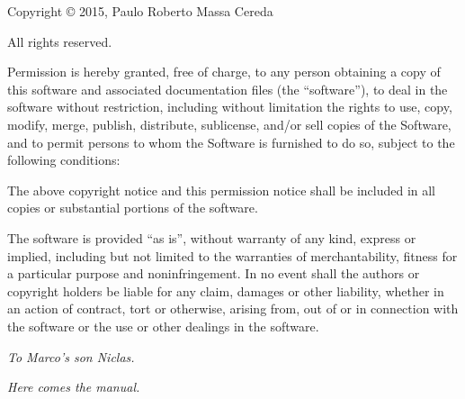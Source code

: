 \documentclass[a4paper,twoside,12pt]{memoir}
\begin{document}
\vspace{1.5em}


\noindent Copyright \copyright{} 2015, Paulo Roberto Massa Cereda

\noindent All rights reserved.

\vspace{1em}

\noindent Permission is hereby granted, free of charge, to any person obtaining a  copy  of this  software  and  associated documentation  files  (the ``software''), to  deal in the software without  restriction, including without limitation the rights to  use, copy, modify,  merge, publish, distribute, sublicense,  and/or sell  copies of  the Software,  and to permit persons to whom the Software  is furnished to do so, subject to the following conditions:

\vspace{1em}

\noindent The above copyright notice and this permission notice shall be included in all copies or substantial portions of the software.

\vspace{1em}

\noindent The software is provided ``as is'', without warranty of any kind, express or implied, including but not limited to the warranties of merchantability, fitness for a particular purpose and noninfringement. In no event shall the authors or copyright holders be liable for any claim, damages or other liability, whether in an action of contract, tort or otherwise, arising from, out of or in connection with the software or the use or other dealings in the software.

\ornamentline

\cleardoublepage

\vspace*{25em}

\begin{flushright}
\em To Marco's son Niclas.
\end{flushright}

\cleardoublepage

\tableofcontents*

\cleardoublepage

\listoffigures*

\cleardoublepage

\listoftables*

\cleardoublepage

\listofcodes*

\mainmatter

\emph{Here comes the manual.}
\end{document}
